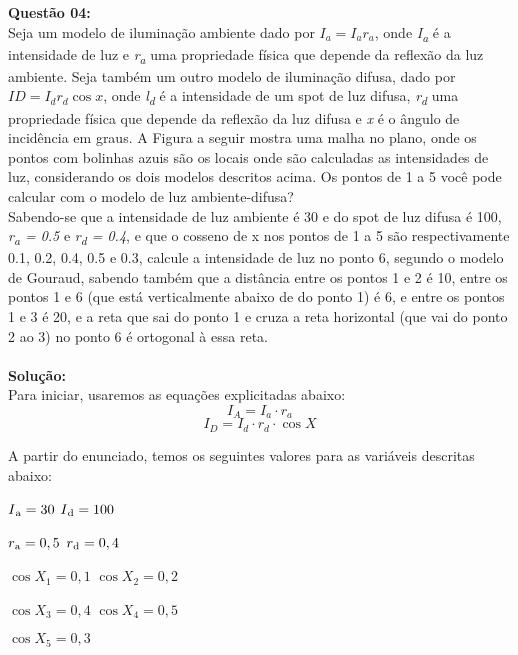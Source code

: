 \noindent\textbf{Questão 04:}\\
Seja um modelo de iluminação ambiente dado por $I_a = I_a r_a$, onde \emph{I\textsubscript{a}} é a intensidade de luz e \emph{r\textsubscript{a}} uma propriedade física que depende da reflexão da luz ambiente. Seja também um outro modelo de iluminação difusa, dado por $ID = I_d r_d \cos{x}$, onde \emph{l\textsubscript{d}} é a intensidade de um spot de luz difusa, \emph{r\textsubscript{d}} uma propriedade física que depende da reflexão da luz difusa e \emph{x} é o ângulo de incidência em graus. A Figura a seguir mostra uma malha no plano, onde os pontos com bolinhas azuis são os locais onde são calculadas as intensidades de luz, considerando os dois modelos descritos acima. Os pontos de 1 a 5 você pode calcular com o modelo de luz ambiente-difusa?\\
Sabendo-se que a intensidade de luz ambiente é 30 e do spot de luz difusa é 100, \emph{r\textsubscript{a} = 0.5} e \emph{r\textsubscript{d} = 0.4}, e que o cosseno de x nos pontos de 1 a 5 são respectivamente 0.1, 0.2, 0.4, 0.5 e 0.3, calcule a intensidade de luz no ponto 6, segundo o modelo de Gouraud, sabendo também que a distância entre os pontos 1 e 2 é 10, entre os pontos 1 e 6 (que está verticalmente abaixo de do ponto 1) é 6, e entre os pontos 1 e 3 é 20, e a reta que sai do ponto 1 e cruza a reta horizontal (que vai do ponto 2 ao 3) no ponto 6 é ortogonal à essa reta.\\
\\
\noindent\textbf{Solução:}\\
\noindent Para iniciar, usaremos as equações explicitadas abaixo:
\[I_A = I_a \cdot r_a\] 
\[I_D = I_d \cdot r_d \cdot \cos{X}\]

\noindent A partir do enunciado, temos os seguintes valores para as variáveis descritas abaixo:
\begin{center}
$I\textsubscript{a} = 30$ \hspace{20pt} $I\textsubscript{d} = 100$
\end{center}
\begin{center}
$r\textsubscript{a} = 0,5$ \hspace{20pt} $r\textsubscript{d} = 0,4$
\end{center}
\begin{center}
\hspace{20pt} $\cos{X_1} = 0,1$ \hspace{20pt} $\cos{X_2} = 0,2$
\end{center}
\begin{center}
\hspace{20pt} $\cos{X_3} = 0,4$ \hspace{20pt} $\cos{X_4} = 0,5$
\end{center}
\begin{center}
\hspace{20pt} $\cos{X_5} = 0,3$
\end{center}

